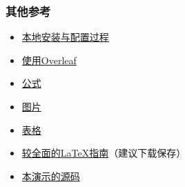 \documentclass{beamer}
\begin{document}
\begin{frame} 
    \frametitle{其他参考} 
    \begin{itemize} 
        \item \href{https://zhuanlan.zhihu.com/p/38178015}{本地安装与配置过程}
        \item \href{https://zhuanlan.zhihu.com/p/67182742}{使用Overleaf}
        \item \href{https://blog.csdn.net/NSJim/article/details/109045914}{公式}
        \item \href{https://blog.csdn.net/qq_31347869/article/details/103832190}{图片}
        \item \href{https://blog.csdn.net/juechenyi/article/details/77116011}{表格}
        \item \href{https://ctan.org/tex-archive/info/lshort/chinese}{较全面的\LaTeX{}指南}（建议下载保存）
        \item \href{https://github.com/MonsTao/WritingPapersWithLatex}{本演示的源码}
    \end{itemize} 
\end{frame}
\end{document}
